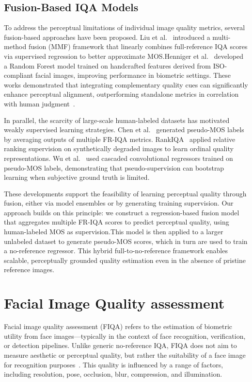 \subsection{Fusion-Based IQA Models}\label{sec:fusion_iqa}

To address the perceptual limitations of individual image quality metrics, several fusion-based approaches have been proposed. Liu et al.~\cite{liu2013mmf} introduced a multi-method fusion (MMF) framework that linearly combines full-reference IQA scores via supervised regression to better approximate MOS.\@ Henniger et al.~\cite{henniger2020biosig} developed a Random Forest model trained on handcrafted features derived from ISO-compliant facial images, improving performance in biometric settings. These works demonstrated that integrating complementary quality cues can significantly enhance perceptual alignment, outperforming standalone metrics in correlation with human judgment~\cite{robinson2020bias}.

In parallel, the scarcity of large-scale human-labeled datasets has motivated weakly supervised learning strategies. Chen et al.~\cite{chen2021pseudo} generated pseudo-MOS labels by averaging outputs of multiple FR-IQA metrics. RankIQA~\cite{liu2017rankiqa} applied relative ranking supervision on synthetically degraded images to learn ordinal quality representations. Wu et al.~\cite{wu2020cascaded} used cascaded convolutional regressors trained on pseudo-MOS labels, demonstrating that pseudo-supervision can bootstrap learning when subjective ground truth is limited.

These developments support the feasibility of learning perceptual quality through fusion, either via model ensembles or by generating training supervision. Our approach builds on this principle: we construct a regression-based fusion model that aggregates multiple FR-IQA scores to predict perceptual quality, using human-labeled MOS as supervision.\@ This model is then applied to a larger unlabeled dataset to generate pseudo-MOS scores, which in turn are used to train a no-reference regressor. This hybrid full-to-no-reference framework enables scalable, perceptually grounded quality estimation even in the absence of pristine reference images.\@

\section{Facial Image Quality assessment}\label{sec:fiqa}

Facial image quality assessment (FIQA) refers to the estimation of biometric utility from face images—typically in the context of face recognition, verification, or detection pipelines. Unlike generic no-reference IQA, FIQA does not aim to measure aesthetic or perceptual quality, but rather the suitability of a face image for recognition purposes~\cite{damer2021localfusion, best2018faceqnet}. This quality is influenced by a range of factors, including resolution, pose, occlusion, blur, compression, and illumination.


